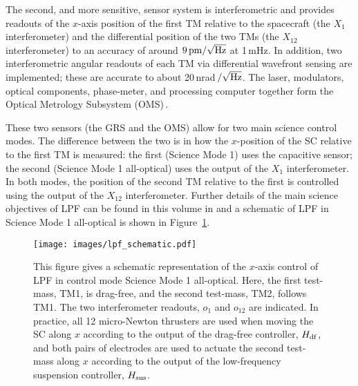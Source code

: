 The second, and more sensitive, sensor system is interferometric and provides readouts
of the $x$-axis position of the first TM relative to the spacecraft (the $X_1$
interferometer) and the differential position of the two TMs (the $X_{12}$ interferometer)
to an accuracy of around $9\,{\rm pm}/\sqrt{\rm Hz}$ at 1\,mHz. In
addition, two interferometric angular readouts of each TM via differential wavefront
sensing are implemented; these are accurate to about 20\,nrad\,$/\sqrt{\rm
Hz}$. The laser, modulators, optical components, phase-meter, and processing computer
together form the Optical Metrology Subsystem (OMS)\,\cite{frank_lisa7}.

These two sensors (the GRS and the OMS) allow for two main science control modes.
The difference between the two is in how the $x$-position of the SC relative to
the first TM is measured: the first (Science Mode 1) uses the capacitive sensor;
the second (Science Mode 1 all-optical) uses the output of the $X_1$ interferometer.
In both modes, the position of the second TM relative to the first is controlled
using the output of the $X_{12}$ interferometer. Further details of the main
science objectives of LPF can be found in this volume in \cite{stefano} and
a schematic of LPF in Science Mode 1 all-optical is shown in Figure~\ref{fig:schematic}.

\begin{figure}[htbp] 
	\centering
	\texttt{[image: images/lpf\_schematic.pdf]}

\caption{This figure gives a schematic representation of the $x$-axis control of LPF
in control mode Science Mode 1 all-optical. Here, the first test-mass, TM1, is
drag-free, and the second test-mass, TM2, follows TM1. The two interferometer
readouts, $o_1$ and $o_{12}$ are indicated. In practice, all 12 micro-Newton thrusters
are used when moving the SC along $x$ according to the output of the drag-free
controller, $H_{\rm df}$, and both pairs of electrodes are used to actuate
the second test-mass along $x$ according to the output of the low-frequency suspension
controller, $H_{\rm sus}$.}

	\label{fig:schematic}
\end{figure}


